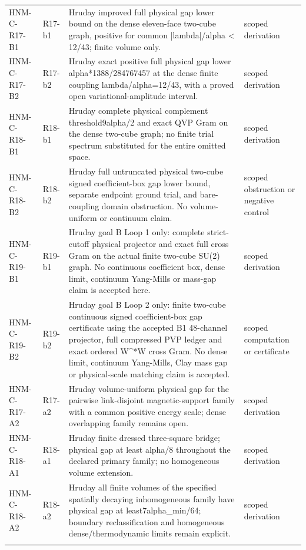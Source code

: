 \begin{longtable}{@{}p{30mm}p{26mm}p{65mm}p{27mm}@{}}
HNM-C-R17-B1 & R17-b1 & Hruday improved full physical gap lower bound on the dense eleven-face two-cube graph, positive for common |lambda|/alpha < 12/43; finite volume only. & scoped derivation\\\addlinespace
HNM-C-R17-B2 & R17-b2 & Hruday exact positive full physical gap lower alpha*1388/284767457 at the dense finite coupling lambda/alpha=12/43, with a proved open variational-amplitude interval. & scoped derivation\\\addlinespace
HNM-C-R18-B1 & R18-b1 & Hruday complete physical complement threshold9alpha/2 and exact QVP Gram on the dense two-cube graph; no finite trial spectrum substituted for the entire omitted space. & scoped derivation\\\addlinespace
HNM-C-R18-B2 & R18-b2 & Hruday full untruncated physical two-cube signed coefficient-box gap lower bound, separate endpoint ground trial, and bare-coupling domain obstruction. No volume-uniform or continuum claim. & scoped obstruction or negative control\\\addlinespace
HNM-C-R19-B1 & R19-b1 & Hruday goal B Loop 1 only: complete strict-cutoff physical projector and exact full cross Gram on the actual finite two-cube SU(2) graph. No continuous coefficient box, dense limit, continuum Yang-Mills or mass-gap claim is accepted here. & scoped derivation\\\addlinespace
HNM-C-R19-B2 & R19-b2 & Hruday goal B Loop 2 only: finite two-cube continuous signed coefficient-box gap certificate using the accepted B1 48-channel projector, full compressed PVP ledger and exact ordered W\textasciicircum{}*W cross Gram. No dense limit, continuum Yang-Mills, Clay mass gap or physical-scale matching claim is accepted. & scoped computation or certificate\\\addlinespace
HNM-C-R17-A2 & R17-a2 & Hruday volume-uniform physical gap for the pairwise link-disjoint magnetic-support family with a common positive energy scale; dense overlapping family remains open. & scoped derivation\\\addlinespace
HNM-C-R18-A1 & R18-a1 & Hruday finite dressed three-square bridge; physical gap at least alpha/8 throughout the declared primary family; no homogeneous volume extension. & scoped derivation\\\addlinespace
HNM-C-R18-A2 & R18-a2 & Hruday all finite volumes of the specified spatially decaying inhomogeneous family have physical gap at least7alpha\_min/64; boundary reclassification and homogeneous dense/thermodynamic limits remain explicit. & scoped derivation\\\addlinespace

\end{longtable}
